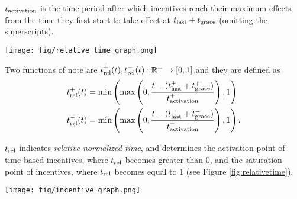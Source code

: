 $t_\textnormal{activation}$ is the time period after which incentives reach their maximum effects from the time they first start to take effect at $t_\textnormal{last}+t_\textnormal{grace}$ (omitting the superscripts).
\begin{Figure}
 \centering
\texttt{[image: fig/relative\_time\_graph.png]}
 \vspace{-0.1in}
\label{fig:relativetime}
\end{Figure}

Two functions of note are $t^+_\textnormal{rel}(t),t^-_\textnormal{rel}(t): \mathbb{R}^+ \rightarrow [0,1]$ and they are defined as
\begin{align}
t_\textnormal{rel}^+(t) &=
\textnormal{min}\left(\textnormal{max}\left(0, \frac{t - (t^+_\textnormal{last} + t^+_\textnormal{grace})}{t^+_\textnormal{activation}}\right), 1\right)\\
t_\textnormal{rel}^-(t) &=
\textnormal{min}\left(\textnormal{max}\left(0, \frac{t - (t^-_\textnormal{last} + t^-_\textnormal{grace})}{t^-_\textnormal{activation}}\right), 1\right)
.
\end{align}

$t_\textnormal{rel}$ indicates \emph{relative normalized time}, and determines the activation point of time-based incentives, where $t_\textnormal{rel}$ becomes greater than $0$, and the saturation point of incentives, where $t_\textnormal{rel}$ becomes equal to $1$ (see Figure \ref{fig:relativetime}).

\begin{Figure}
 \centering
 \texttt{[image: fig/incentive\_graph.png]}
\label{fig:incentive_multiplier_graphs}
\end{Figure}
